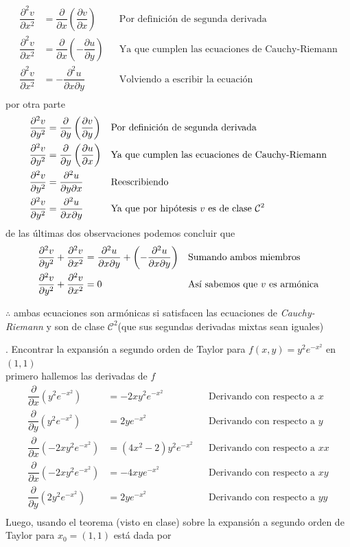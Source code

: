\documentclass[letterpaper]{article}
\renewcommand{\d}{\partial}
\renewcommand{\*}{\cdot}
\theoremstyle{definition}
\begin{document}
\begin{align*}
\dfrac{\d^2v}{\d x^2} &= \dfrac{\d}{\d x}\left( \dfrac{\d v}{\d x} \right) &&\text{Por definición de segunda derivada}\\
\dfrac{\d^2v}{\d x^2} &= \dfrac{\d}{\d x}\left( - \dfrac{\d u}{\d y} \right) &&\text{Ya que cumplen las ecuaciones de Cauchy-Riemann}\\
\dfrac{\d^2v}{\d x^2} &= - \dfrac{\d^2 u}{\d x\d y}  &&\text{Volviendo a escribir la ecuación}\\
\end{align*}
por otra parte
\begin{align*}
\dfrac{\d^2v}{\d y^2} &= \dfrac{\d}{\d y}\left( \dfrac{\d v}{\d y} \right) &&\text{Por definición de segunda derivada}\\
\dfrac{\d^2v}{\d y^2} &= \dfrac{\d}{\d y}\left(\dfrac{\d u}{\d x} \right) &&\text{Ya que cumplen las ecuaciones de Cauchy-Riemann}\\
\dfrac{\d^2v}{\d y^2} &= \dfrac{\d^2 u}{\d y\d x}&&\text{Reescribiendo}\\
\dfrac{\d^2v}{\d y^2} &=\dfrac{\d^2 u}{\d x\d y}&&\text{Ya que por hipótesis $ v $ es de clase }\mathcal{C}^2\\
\end{align*}
de las últimas dos observaciones podemos concluir que
\begin{align*}
\dfrac{\d^2v}{\d y^2} +\dfrac{\d^2v}{\d x^2} &= \dfrac{\d^2 u}{\d x\d y} +\left( - \dfrac{\d^2 u}{\d x\d y} \right)&&\text{Sumando ambos miembros }\\
\dfrac{\d^2v}{\d y^2} +\dfrac{\d^2v}{\d x^2} &= 0  &&\text{Así sabemos que $ v $ es armónica}\\
\end{align*}
\begin{center}
	$ \therefore $ ambas ecuaciones son armónicas si satisfacen las ecuaciones de  \textit{Cauchy-Riemann} y son de clase $ \mathcal{C}^2 $(que sus segundas derivadas mixtas sean iguales)
\end{center}
. Encontrar la expansión a segundo orden de Taylor para $f(x,y) = y^2e^{-x^2}$ en $(1,1)$\\

primero hallemos las derivadas de $ f $
\begin{align*}
	\dfrac{\d}{\d x} (y^2 e^{-x^2}) &= -2xy^2e^{-x^2} &&\text{Derivando con respecto a }x\\
	\dfrac{\d}{\d y} (y^2 e^{-x^2}) &= 2ye^{-x^2} &&\text{Derivando con respecto a }y\\
	\dfrac{\d}{\d x} (-2xy^2e^{-x^2}) &= (4x^2 - 2)y^2e^{-x^2} &&\text{Derivando con respecto a }xx\\
	\dfrac{\d}{\d x} (-2xy^2e^{-x^2}) &= -4xye^{-x^2} &&\text{Derivando con respecto a }xy\\
	\dfrac{\d}{\d y} (2y^2e^{-x^2}) &= 2ye^{-x^2} &&\text{Derivando con respecto a }yy\\
\end{align*}
Luego, usando el teorema (visto en clase) sobre la expansión a segundo orden de Taylor para $ x_0 =(1,1) $ está dada por
\end{document}
